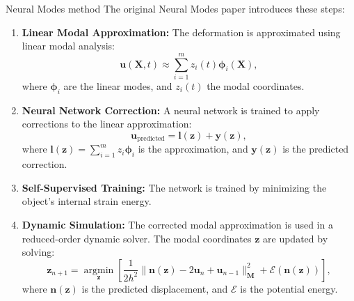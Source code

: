 \documentclass[9pt]{beamer}
\DeclareMathOperator{\argmin}{argmin}
\begin{document}
\begin{frame}[allowframebreaks]{Neural Modes method}
    The original Neural Modes paper \cite{Wang_Du_Coros_Thomaszewski_2024} introduces these steps:
        
        \begin{enumerate}
            \item \textbf{Linear Modal Approximation:} The deformation is approximated using linear modal analysis:
            \[
                \bm{u}(\bm{X}, t) \approx \sum_{i=1}^{m} z_i(t) \bm{\phi}_i(\bm{X}),
            \]
            where \( \bm{\phi}_i \) are the linear modes, and \( z_i(t) \) the modal coordinates.

            \item \textbf{Neural Network Correction:} A neural network is trained to apply corrections to the linear approximation:
            \[
                \bm{u}_{\text{predicted}} = \bm{l}(\mathbf{z}) + \bm{y}(\mathbf{z}),
            \]
            where \( \bm{l}(\mathbf{z}) = \sum_{i=1}^{m} z_i \bm{\phi}_i \) is the approximation, and \( \bm{y}(\mathbf{z}) \) is the predicted correction.

            \item \textbf{Self-Supervised Training:} The network is trained by minimizing the object's internal strain energy.
            \item \textbf{Dynamic Simulation:} The corrected modal approximation is used in a reduced-order dynamic solver. The modal coordinates \( \mathbf{z} \) are updated by solving:
            \begin{equation}
                \mathbf{z}_{n+1} = \underset{\mathbf{z}}{\argmin} \left[ \frac{1}{2h^2} \|\bm{n}(\mathbf{z}) - 2\bm{u}_n + \bm{u}_{n-1}\|_{\bm{M}}^2 + \mathcal{E}(\bm{n}(\mathbf{z})) \right],
                \label{eq:dynamic_update}
            \end{equation}
            where \( \bm{n}(\mathbf{z}) \) is the predicted displacement, and \( \mathcal{E} \) is the potential energy.
        \end{enumerate}
    
\end{frame}
\end{document}
